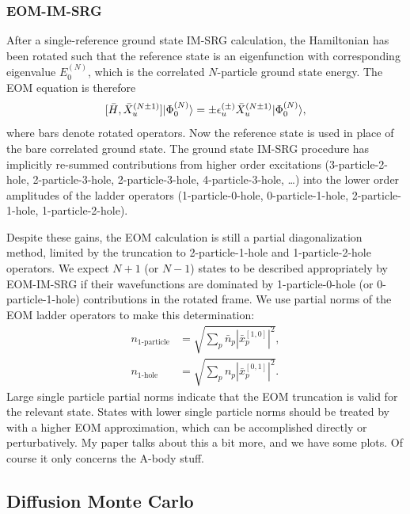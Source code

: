 \subsubsection*{EOM-IM-SRG}
After a single-reference ground state IM-SRG calculation, the Hamiltonian has been rotated such that the reference state is an eigenfunction with corresponding eigenvalue $E^{(N)}_0$, which is the correlated $N$-particle ground state energy. The EOM equation is therefore
\begin{equation}\label{eq:EOMIMSRG}
  [\bar{H},\bar{X}^{(N \pm 1)}_u] | \Phi^{(N)}_0 \rangle = \pm \epsilon^{(\pm)}_u \bar{X}^{(N \pm 1)}_u | \Phi^{(N)}_0 \rangle,
\end{equation}
where bars denote rotated operators. Now the reference state is used in place of the bare correlated ground state. The ground state IM-SRG procedure has implicitly re-summed contributions from higher order excitations (3-particle-2-hole, 2-particle-3-hole, 2-particle-3-hole, 4-particle-3-hole, \ldots) into the lower order amplitudes of the ladder operators (1-particle-0-hole, 0-particle-1-hole, 2-particle-1-hole, 1-particle-2-hole).

Despite these gains, the EOM calculation is still a partial diagonalization method, limited by the truncation to 2-particle-1-hole and 1-particle-2-hole operators. We expect $N + 1$ (or $N - 1$) states to be described appropriately by EOM-IM-SRG if their wavefunctions are dominated by 1-particle-0-hole (or 0-particle-1-hole) contributions in the rotated frame. We use partial norms of the EOM ladder operators to make this determination:
\begin{align}\label{eq:partial_norms}
  n_{\text{1-particle}} &= \sqrt{\sum_p \bar{n}_p | \bar{x}^{[1,0]}_p |^2},\\
  n_{\text{1-hole}} &= \sqrt{\sum_p n_p | \bar{x}^{[0,1]}_p |^2}.
\end{align}
Large single particle partial norms indicate that the EOM truncation is valid for the relevant state. States with lower single particle norms should be treated by with a higher EOM approximation, which can be accomplished directly or perturbatively. {\color{red} My paper talks about this a bit more, and we have some plots. Of course it only concerns the A-body stuff}.

\subsection{Diffusion Monte Carlo}
\label{subsec:DMC}


